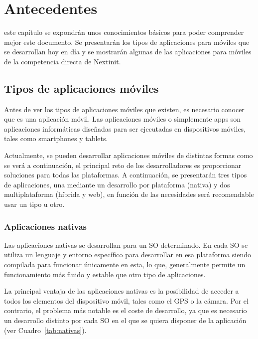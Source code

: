 \chapter{Antecedentes}
\label{chap:antecedentes}

 este capítulo se expondrán unos conocimientos básicos para poder comprender mejor este documento. Se presentarán 
los tipos de aplicaciones para móviles que se desarrollan hoy en día y se mostrarán algunas de las aplicaciones para móviles
de la competencia directa de Nextinit.

\section{Tipos de aplicaciones móviles}

Antes de ver los tipos de aplicaciones móviles que existen, es necesario conocer que es una aplicación móvil. Las aplicaciones
móviles o simplemente apps son aplicaciones informáticas diseñadas para ser ejecutadas en dispositivos móviles, tales 
como smartphones y tablets.

Actualmente, se pueden desarrollar aplicaciones móviles de distintas formas \cite{ANADES} como se verá a continuación, el 
principal reto de los desarrolladores es proporcionar soluciones para todas las plataformas.  A continuación, se presentarán 
tres tipos de aplicaciones, una mediante un desarrollo por plataforma (nativa) y dos multiplataforma (híbrida y web), en 
función de las necesidades será recomendable usar un tipo u otro.

\subsection{Aplicaciones nativas}

Las aplicaciones nativas se desarrollan para un \acf{SO} determinado. En cada \acs{SO} se utiliza un lenguaje y entorno 
específico para desarrollar en esa plataforma siendo compilada para funcionar únicamente en esta, lo que, generalmente 
permite un funcionamiento más fluido y estable que otro tipo de aplicaciones.

La principal ventaja de las aplicaciones nativas es la posibilidad de acceder a todos los elementos del dispositivo móvil, tales
como el \acs{GPS} o la cámara. Por el contrario, el problema más notable es el coste de desarrollo, ya que es necesario
un desarrollo distinto por cada \acs{SO} en el que se quiera disponer de la aplicación (ver Cuadro~\ref{tab:nativas}).

